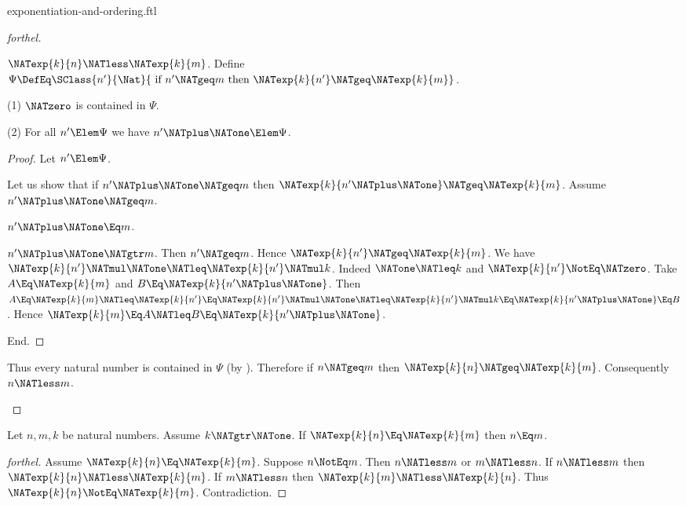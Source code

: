 \documentclass{stex}
\begin{document}
\begin{smodule}{exponentiation-and-ordering.ftl}
\begin{proof}[forthel]
  \begin{case}{$\NATexp{k}{n} \NATless \NATexp{k}{m}$.}
    Define $\Psi \DefEq \SClass{n'}{\Nat}{\text{ if }n' \NATgeq m\text{ then }
    \NATexp{k}{n'} \NATgeq \NATexp{k}{m}}$.

    (1) $\NATzero$ is contained in $\Psi$.

    (2) For all $n' \Elem \Psi$ we have $n' \NATplus \NATone \Elem \Psi$.
    \begin{proof}
      Let $n' \Elem \Psi$.

      Let us show that if $n' \NATplus \NATone \NATgeq m$ then $\NATexp{k}{n' \NATplus \NATone} \NATgeq \NATexp{k}{m}$.
        Assume $n' \NATplus \NATone \NATgeq m$.

        \begin{case}{$n' \NATplus \NATone \Eq m$.} \end{case}

        \begin{case}{$n' \NATplus \NATone \NATgtr m$.}
          Then $n' \NATgeq m$.
          Hence $\NATexp{k}{n'} \NATgeq \NATexp{k}{m}$.
          We have $\NATexp{k}{n'} \NATmul \NATone \NATleq \NATexp{k}{n'} \NATmul k$.
          Indeed $\NATone \NATleq k$ and $\NATexp{k}{n'} \NotEq \NATzero$.
          Take $A \Eq \NATexp{k}{m}$ and $B \Eq \NATexp{k}{n' \NATplus \NATone}$. %
          Then $A
            \Eq \NATexp{k}{m}
            \NATleq \NATexp{k}{n'}
            \Eq \NATexp{k}{n'} \NATmul \NATone
            \NATleq \NATexp{k}{n'} \NATmul k
            \Eq \NATexp{k}{n' \NATplus \NATone}
            \Eq B$.
          Hence $\NATexp{k}{m} \Eq A \NATleq B \Eq \NATexp{k}{n' \NATplus \NATone}$.
        \end{case}
      End.
    \end{proof}

    Thus every natural number is contained in $\Psi$ (by ).
    Therefore if $n \NATgeq m$ then $\NATexp{k}{n} \NATgeq \NATexp{k}{m}$.
    Consequently $n \NATless m$.
  \end{case}
\end{proof}

\begin{corollary}[forthel]
  Let $n, m, k$ be natural numbers.
  Assume $k \NATgtr \NATone$.
  If $\NATexp{k}{n} \Eq \NATexp{k}{m}$ then $n \Eq m$.
\end{corollary}
\begin{proof}[forthel]
  Assume $\NATexp{k}{n} \Eq \NATexp{k}{m}$.
  Suppose $n \NotEq m$.
  Then $n \NATless m$ or $m \NATless n$.
  If $n \NATless m$ then $\NATexp{k}{n} \NATless \NATexp{k}{m}$.
  If $m \NATless n$ then $\NATexp{k}{m} \NATless \NATexp{k}{n}$.
  Thus $\NATexp{k}{n} \NotEq \NATexp{k}{m}$.
  Contradiction.
\end{proof}


\end{smodule}
\end{document}
